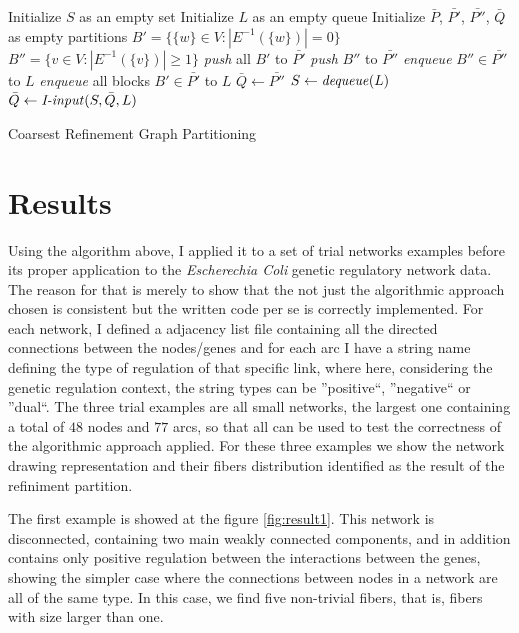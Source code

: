 \documentclass[12pt]{diazessay} %
\begin{document}
\begin{algorithm}[h]
	\SetAlgoLined
	Initialize $S$ as an empty set\;
	Initialize $L$ as an empty queue\;
	Initialize $\bar{P}$, $\bar{P'}$, $\bar{P''}$, $\bar{Q}$ as empty partitions\;
	$B' = \{ \{ w \} \in V : |E^{-1}(\{w\})|=0 \}$\;
	$B'' = \{ v \in V : |E^{-1}(\{v\})| \geq 1 \}$\;
	\textit{push} all $B'$ to $\bar{P'}$\;
	\textit{push} $B''$ to $\bar{P''}$\;
	\textit{enqueue} $B'' \in \bar{P''}$ to $L$\;
	\textit{enqueue} all blocks $B' \in \bar{P'}$ to $L$\;
	$\bar{Q} \leftarrow \bar{P''}$\;
	{
		$S \leftarrow \text{\textit{dequeue}}(L)$\;
		$\bar{Q} \leftarrow \text{\textit{I-input}}(S, \bar{Q}, L)$
	}
	\caption{Coarsest Refinement Graph Partitioning}
	\label{alg:partitioning}
\end{algorithm}


\section*{Results}

Using the algorithm above, I applied it to a set of trial networks examples before its proper application to the \textit{Escherechia Coli} genetic regulatory network data. The reason for that is merely to show that the not just the algorithmic approach chosen is consistent but the written code per se is correctly implemented. For each network, I defined a adjacency list file containing all the directed connections between the nodes/genes and for each arc I have a string name defining the type of regulation of that specific link, where here, considering the genetic regulation context, the string types can be ''positive``, ''negative`` or ''dual``. The three trial examples are all small networks, the largest one containing a total of $48$ nodes and $77$ arcs, so that all can be used to test the correctness of the algorithmic approach applied. For these three examples we show the network drawing representation and their fibers distribution identified as the result of the refiniment partition.

The first example is showed at the figure \ref{fig:result1}. This network is disconnected, containing two main weakly connected components, and in addition contains only positive regulation between the interactions between the genes, showing the simpler case where the connections between nodes in a network are all of the same type. In this case, we find five non-trivial fibers, that is, fibers with size larger than one.
\end{document}

